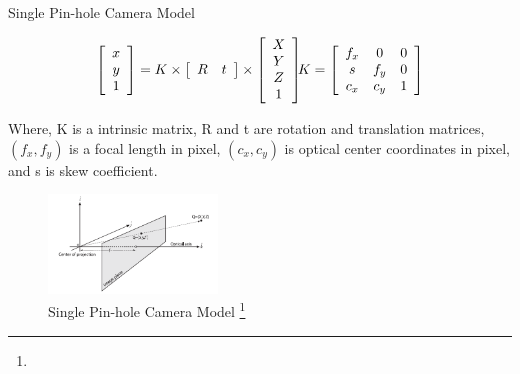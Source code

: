 \documentclass[10pt]{beamer}
\begin{document}
\begin{frame}{Single Pin-hole Camera Model}


$$\left[\begin{array}{ccc}
x \\
y \\
1
\end{array}\right] 
 = K \times 
\left[\begin{array}{ccc}
R & t
\end{array}\right] 
 \times
\left[\begin{array}{ccc}
X \\
Y \\
Z \\
1
\end{array}\right]  
\hspace{-4pt}
K = \left[\begin{array}{ccc}f_{x} & 0 & 0 \\ s & f_{y} & 0 \\ c_{x} & c_{y} & 1\end{array}\right]$$ 


Where, K is a intrinsic matrix, R and t are rotation and translation matrices, $(f_{x},f_{y})$ is a focal length in pixel, $(c_{x},c_{y})$ is optical center coordinates in pixel, and s is skew coefficient.   
  

\begin{figure}
    \centering
    \includegraphics[width= 0.4\textwidth]{Images/pinhole.png}
    \caption{Single Pin-hole Camera Model \footnote{}}
\end{figure}    
\end{frame}
\end{document}
